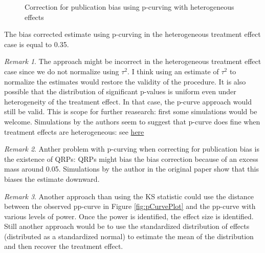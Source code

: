 \documentclass[
]{book}
\theoremstyle{definition}
\theoremstyle{definition}
\theoremstyle{definition}
\theoremstyle{definition}
\theoremstyle{remark}
\newtheorem*{remark}{Remark}
\begin{document}
\begin{figure}[htbp]

{\centering {}

}

\caption{Correction for publication bias using p-curving with heterogeneous effects}\label{fig:pCurvePubBiasREPlot}
\end{figure}

The bias corrected estimate using p-curving in the heterogeneous treatment effect case is equal to 0.35.

\begin{remark}
\iffalse{} {Remark. } \fi{}The approach might be incorrect in the heterogeneous treatment effect case since we do not normalize using \(\tau^2\).
I think using an estimate of \(\tau^2\) to normalize the estimates would restore the validity of the procedure.
It is also possible that the distribution of significant p-values is uniform even under heterogeneity of the treatment effect.
In that case, the p-curve approach would still be valid.
This is scope for further reasearch: first some simulations would be welcome.
Simulations by the authors seem to suggest that p-curve does fine when treatment effects are heterogeneous: see \href{http://datacolada.org/67}{here}
\end{remark}

\begin{remark}
\iffalse{} {Remark. } \fi{}Anther problem with p-curving when correcting for publication bias is the existence of QRPs: QRPs might bias the bias correction because of an excess mass around 0.05.
Simulations by the author in the original paper show that this biases the estimate downward.
\end{remark}

\begin{remark}
\iffalse{} {Remark. } \fi{}Another approach than using the KS statistic could use the distance between the observed pp-curve in Figure \ref{fig:pCurvePlot} and the pp-curve with various levels of power.
Once the power is identified, the effect size is identified.
Still another approach would be to use the standardized distribution of effects (distributed as a standardized normal) to estimate the mean of the distribution and then recover the treatment effect.
\end{remark}
\end{document}
